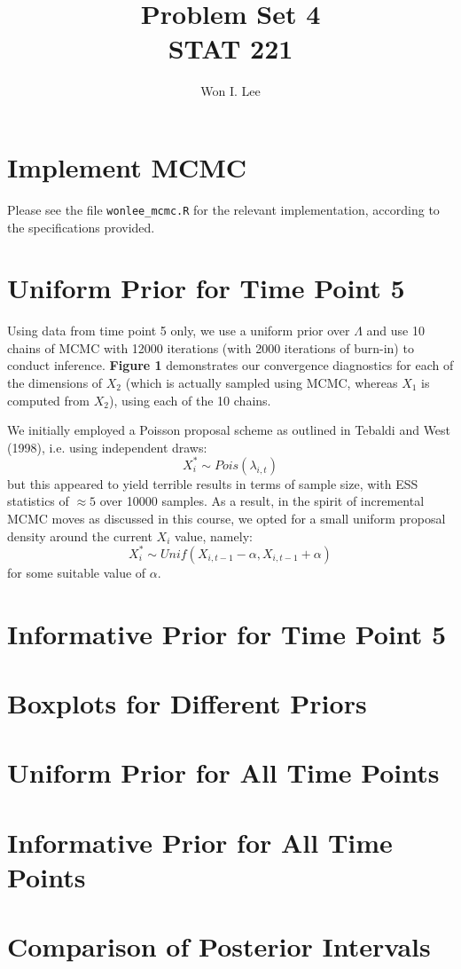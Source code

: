\documentclass[psamsfonts]{amsart}
\title{Problem Set 4 \\ STAT 221}
\author{Won I. Lee}
\theoremstyle{definition}
\theoremstyle{remark}
\numberwithin{equation}{section}
\begin{document}
	
\maketitle

\section{Implement MCMC}

Please see the file \texttt{wonlee\_mcmc.R} for the relevant implementation, according to the specifications provided.

\section{Uniform Prior for Time Point 5}

Using data from time point 5 only, we use a uniform prior over $\Lambda$ and use 10 chains of MCMC with 12000 iterations (with 2000 iterations of burn-in) to conduct inference. {\bf Figure 1} demonstrates our convergence diagnostics for each of the dimensions of $X_2$ (which is actually sampled using MCMC, whereas $X_1$ is computed from $X_2$), using each of the 10 chains.

We initially employed a Poisson proposal scheme as outlined in Tebaldi and West (1998), i.e. using independent draws:
$$X_i^* \sim Pois(\lambda_{i,t})$$
but this appeared to yield terrible results in terms of sample size, with ESS statistics of $\approx 5$ over 10000 samples. As a result, in the spirit of incremental MCMC moves as discussed in this course, we opted for a small uniform proposal density around the current $X_i$ value, namely:
$$X_i^* \sim Unif(X_{i,t-1} - \alpha, X_{i,t-1} + \alpha)$$
for some suitable value of $\alpha$.

\section{Informative Prior for Time Point 5}

\section{Boxplots for Different Priors}

\section{Uniform Prior for All Time Points}

\section{Informative Prior for All Time Points}

\section{Comparison of Posterior Intervals}
\end{document}
